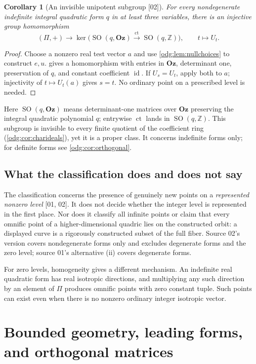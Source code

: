 \documentclass[11pt,oneside]{article}
\numberwithin{equation}{section}
\newtheorem{corollary}[corollary]{Corollary}
\theoremstyle{definition}
\theoremstyle{remark}
\newcommand{\Oz}{\mathbf{Oz}}
\newcommand{\Z}{\mathbb Z}
\newcommand{\ct}{\operatorname{ct}}
\newcommand{\SO}{\operatorname{SO}}
\newcommand{\id}{\operatorname{id}}
\newcommand{\src}[1]{\textup{\textsf{\small[#1]}}}
\begin{document}
\begin{corollary}[An invisible unipotent subgroup \src{02}]\label{odg:cor:unipotent}
For every nondegenerate indefinite integral quadratic form $q$ in at least
three variables, there is an injective group homomorphism
\[
 (\Pi,+)\longrightarrow
 \ker\bigl(\SO(q,\Oz)\xrightarrow{\ \ct\ }\SO(q,\Z)\bigr),
 \qquad t\longmapsto U_t.
\]
\end{corollary}
\begin{proof}
Choose a nonzero real test vector $a$ and use \cref{odg:lem:nullchoices} to
construct $e,u$.  gives a homomorphism with
entries in $\Oz$, determinant one, preservation of $q$, and constant
coefficient $\id$. If $U_s=U_t$, apply both to $a$; injectivity of
$t\mapsto U_t(a)$ gives $s=t$. No ordinary point on a prescribed level is
needed.
\end{proof}

Here $\SO(q,\Oz)$ means determinant-one matrices over $\Oz$ preserving the
integral quadratic polynomial $q$; entrywise $\ct$ lands in $\SO(q,\Z)$.
This subgroup is invisible to every finite quotient of the coefficient ring
(\cref{odg:cor:charideals}), yet it is a proper class. It concerns indefinite
forms only; for definite forms see \cref{odg:cor:orthogonal}.

\subsection{What the classification does and does not say}

The classification concerns the presence of genuinely new points on a
\emph{represented nonzero level} \src{01, 02}. It does not decide whether the
integer level is represented in the first place. Nor does it classify all
infinite points or claim that every omnific point of a higher-dimensional
quadric lies on the constructed orbit: a displayed curve is a rigorously
constructed subset of the full fiber. Source 02's version covers nondegenerate
forms only and excludes degenerate forms and the zero level; source 01's
alternative (ii) covers degenerate forms.

For zero levels, homogeneity gives a different mechanism. An indefinite
real quadratic form has real isotropic directions, and multiplying any
such direction by an element of $\Pi$ produces omnific points with zero
constant tuple. Such points can exist even when there is no nonzero
ordinary integer isotropic vector.

\section{Bounded geometry, leading forms, and orthogonal matrices}\label{odg:sec:obstructions}
\end{document}
